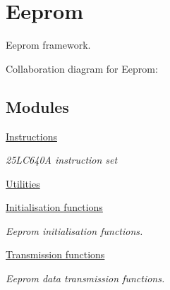 \hypertarget{group___eeprom}{}\section{Eeprom}
\label{group___eeprom}


Eeprom framework.  


Collaboration diagram for Eeprom\+:
\subsection*{Modules}
\begin{DoxyCompactItemize}
\item 
\hyperlink{group___instructions}{Instructions}
\begin{DoxyCompactList}\small\item\em 25\+L\+C640A instruction set \end{DoxyCompactList}\item 
\hyperlink{group___utilities}{Utilities}
\item 
\hyperlink{group___eeprom___init}{Initialisation functions}
\begin{DoxyCompactList}\small\item\em Eeprom initialisation functions. \end{DoxyCompactList}\item 
\hyperlink{group___eeprom___trans}{Transmission functions}
\begin{DoxyCompactList}\small\item\em Eeprom data transmission functions. \end{DoxyCompactList}\end{DoxyCompactItemize}
